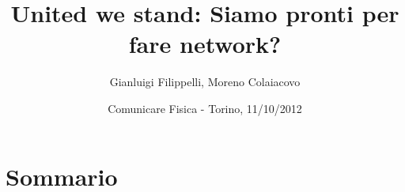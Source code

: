 \documentclass{beamer}
\title[Un network italiano]{United we stand: Siamo pronti per fare network?}
\author[G.Filippelli, M.Colaiacovo]{Gianluigi Filippelli, Moreno Colaiacovo}
\date{Comunicare Fisica - Torino, 11/10/2012}
\begin{document}
%
\begin{frame}
 \titlepage
\end{frame}
%
\section*{Sommario}
\begin{frame}
 \scriptsize
 \tableofcontents[pausesections]
\end{frame}
%
%


%
\end{document}
